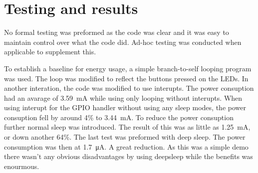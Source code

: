 \section{Testing and results}
No formal testing was preformed as the code was clear and it was easy to maintain control over what the code did.
Ad-hoc testing was conducted when applicable to supplement this.

To establish a baseline for energy usage, a simple branch-to-self looping program was used.
The loop was modified to reflect the buttons pressed on the LEDs.
In another interation, the code was modified to use interupts.
The power consuption had an avarage of \SI{3.59}{\milli\ampere} while using only looping without interupts. 
When using interupt for the GPIO handler without using any sleep modes, the power consuption fell by around 4\% to \SI{3.44}{\milli\ampere}.
To reduce the power consuption further normal sleep was introduced.
The result of this was as little as \SI{1.25}{\milli\ampere}, or down another 64\%.
The last test was preformed with deep sleep.
The power consumption was then at \SI{1.7}{\micro\ampere}.
A great reduction.
As this was a simple demo there wasn't any obvious disadvantages by using deepsleep while the benefits was enourmous.
